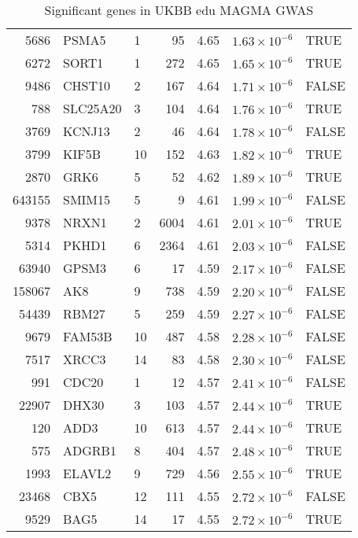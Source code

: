 \begin{table}[ht]
\begin{adjustbox}{totalheight=10in}
\begin{tabular}{rllrrrl}
  5686 & PSMA5 & 1 &  95 & 4.65 & $1.63 \times 10^{-6}$ & TRUE \\ 
  6272 & SORT1 & 1 & 272 & 4.65 & $1.65 \times 10^{-6}$ & TRUE \\ 
  9486 & CHST10 & 2 & 167 & 4.64 & $1.71 \times 10^{-6}$ & FALSE \\ 
  788 & SLC25A20 & 3 & 104 & 4.64 & $1.76 \times 10^{-6}$ & TRUE \\ 
  3769 & KCNJ13 & 2 &  46 & 4.64 & $1.78 \times 10^{-6}$ & FALSE \\ 
  3799 & KIF5B & 10 & 152 & 4.63 & $1.82 \times 10^{-6}$ & TRUE \\ 
  2870 & GRK6 & 5 &  52 & 4.62 & $1.89 \times 10^{-6}$ & TRUE \\ 
  643155 & SMIM15 & 5 &   9 & 4.61 & $1.99 \times 10^{-6}$ & FALSE \\ 
  9378 & NRXN1 & 2 & 6004 & 4.61 & $2.01 \times 10^{-6}$ & TRUE \\ 
  5314 & PKHD1 & 6 & 2364 & 4.61 & $2.03 \times 10^{-6}$ & FALSE \\ 
  63940 & GPSM3 & 6 &  17 & 4.59 & $2.17 \times 10^{-6}$ & FALSE \\ 
  158067 & AK8 & 9 & 738 & 4.59 & $2.20 \times 10^{-6}$ & FALSE \\ 
  54439 & RBM27 & 5 & 259 & 4.59 & $2.27 \times 10^{-6}$ & FALSE \\ 
  9679 & FAM53B & 10 & 487 & 4.58 & $2.28 \times 10^{-6}$ & FALSE \\ 
  7517 & XRCC3 & 14 &  83 & 4.58 & $2.30 \times 10^{-6}$ & FALSE \\ 
  991 & CDC20 & 1 &  12 & 4.57 & $2.41 \times 10^{-6}$ & FALSE \\ 
  22907 & DHX30 & 3 & 103 & 4.57 & $2.44 \times 10^{-6}$ & TRUE \\ 
  120 & ADD3 & 10 & 613 & 4.57 & $2.44 \times 10^{-6}$ & TRUE \\ 
  575 & ADGRB1 & 8 & 404 & 4.57 & $2.48 \times 10^{-6}$ & TRUE \\ 
  1993 & ELAVL2 & 9 & 729 & 4.56 & $2.55 \times 10^{-6}$ & TRUE \\ 
  23468 & CBX5 & 12 & 111 & 4.55 & $2.72 \times 10^{-6}$ & FALSE \\ 
  9529 & BAG5 & 14 &  17 & 4.55 & $2.72 \times 10^{-6}$ & TRUE \\ 
   \hline
\end{tabular}
\end{adjustbox}
\caption{Significant genes in UKBB edu MAGMA GWAS} 
\label{tab:Significant genes in UKBB edu MAGMA GWAS}
\end{table}





